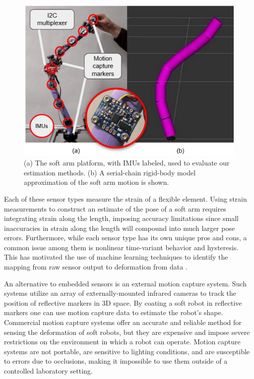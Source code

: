 \begin{figure}
    \centering
    \includegraphics[width=\linewidth]{fig/schematic2.png}
    \caption{(a) The soft arm platform, with IMUs labeled, used to evaluate our estimation methods. (b) A serial-chain rigid-body model approximation of the soft arm motion is shown.}
    \label{fig:schematic}
\end{figure}

Each of these sensor types measure the strain of a flexible element.
Using strain measurements to construct an estimate of the pose of a soft arm requires integrating strain along the length, imposing accuracy limitations since small inaccuracies in strain along the length will compound into much larger pose errors.
Furthermore, while each sensor type has its own unique pros and cons, a common issue among them is nonlinear time-variant behavior and hysteresis.
This has motivated the use of machine learning techniques to identify the mapping from raw sensor output to deformation from data \cite{tapia2020_makesense, truby2020_piezo, thuruthel2019soft}.

An alternative to embedded sensors is an external motion capture system.
Such systems utilize an array of externally-mounted infrared cameras to track the position of reflective markers in 3D space.
By coating a soft robot in reflective markers one can use motion capture data to estimate the robot’s shape.
Commercial motion capture systems offer an accurate and reliable method for sensing the deformation of soft robots, but they are expensive and impose severe restrictions on the environment in which a robot can operate.
Motion capture systems are not portable, are sensitive to lighting conditions, and are susceptible to errors due to occlusions, making it impossible to use them outside of a controlled laboratory setting.

